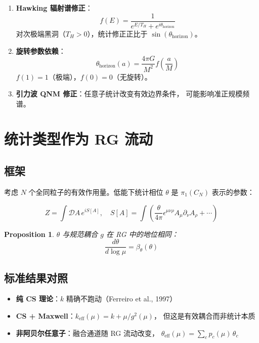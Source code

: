 \documentclass[11pt,a4paper]{article}
\newtheorem{proposition}{Proposition}[section]
\begin{document}
\begin{enumerate}
\item \textbf{Hawking 辐射谱修正}：
\begin{equation}
f(E) = \frac{1}{e^{E/T_H} + e^{i\theta_{\text{horizon}}}}
\end{equation}
对次极端黑洞（$T_H > 0$），统计修正正比于
$\sin(\theta_{\text{horizon}})$。

\item \textbf{旋转参数依赖}：
\begin{equation}
\theta_{\text{horizon}}(a) = \frac{4\pi G}{M^2} f\!\left(\frac{a}{M}\right)
\end{equation}
$f(1)=1$（极端），$f(0)=0$（无旋转）。

\item \textbf{引力波 QNM 修正}：任意子统计改变有效边界条件，
可能影响准正规模频谱。
\end{enumerate}

\section{统计类型作为 RG 流动}

\subsection{框架}

考虑 $N$ 个全同粒子的有效作用量。低能下统计相位 $\theta$ 是
$\pi_1(C_N)$ 表示的参数：

\begin{equation}
Z = \int \mathcal{D}A\, e^{iS[A]},\quad S[A] = \int\left(
\frac{\theta}{4\pi}\epsilon^{\mu\nu\rho}A_\mu\partial_\nu A_\rho + \cdots\right)
\end{equation}

\begin{proposition}
$\theta$ 与规范耦合 $g$ 在 RG 中的地位相同：
\begin{equation}
\frac{d\theta}{d\log\mu} = \beta_\theta(\theta)
\end{equation}
\end{proposition}

\subsection{标准结果对照}

\begin{itemize}
\item \textbf{纯 CS 理论}：$k$ 精确不跑动（Ferreiro et al., 1997）
\item \textbf{CS + Maxwell}：$k_{\text{eff}}(\mu) = k + \mu/g^2(\mu)$，
但这是有效耦合而非统计本质
\item \textbf{非阿贝尔任意子}：融合通道随 RG 流动改变，
$\theta_{\text{eff}}(\mu) = \sum_c p_c(\mu)\,\theta_c$
\end{itemize}
\end{document}
